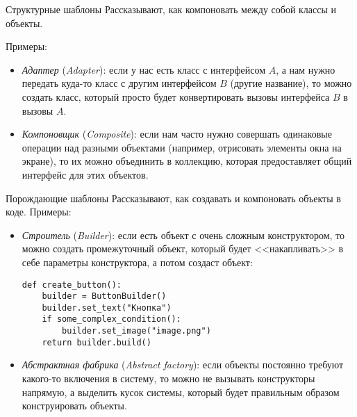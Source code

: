 \begin{frame}{Структурные шаблоны}
	Рассказывают, как компоновать между собой классы и объекты.

	Примеры:
	\begin{itemize}
		\item
			\textit{Адаптер} (\textit{Adapter}): если у нас есть класс с интерфейсом $A$, а нам нужно передать куда-то класс с другим интерфейсом $B$
			(другие название), то можно создать класс, который просто будет конвертировать вызовы интерфейса $B$ в вызовы $A$.
		\item
			\textit{Компоновщик} (\textit{Composite}): если нам часто нужно совершать одинаковые операции над разными объектами (например, отрисовать элементы
			окна на экране), то их можно объединить в коллекцию, которая предоставляет общий интерфейс для этих объектов.
	\end{itemize}
\end{frame}

\begin{frame}[fragile]{Порождающие шаблоны}
	Рассказывают, как создавать и компоновать объекты в коде.
	Примеры:
	\begin{itemize}
		\item
			\textit{Строитель} (\textit{Builder}): если есть объект с очень сложным конструктором, то можно создать
			промежуточный объект, который будет <<накапливать>> в себе параметры конструктора, а потом создаст объект:
\begin{verbatim}
def create_button():
    builder = ButtonBuilder()
    builder.set_text("Кнопка")
    if some_complex_condition():
        builder.set_image("image.png")
    return builder.build()
\end{verbatim}
		\item
			\textit{Абстрактная фабрика}  (\textit{Abstract factory}): если объекты постоянно требуют какого-то включения в систему, то можно
			не вызывать конструкторы напрямую, а выделить кусок системы, который будет
			правильным образом конструировать объекты.
	\end{itemize}
\end{frame}
